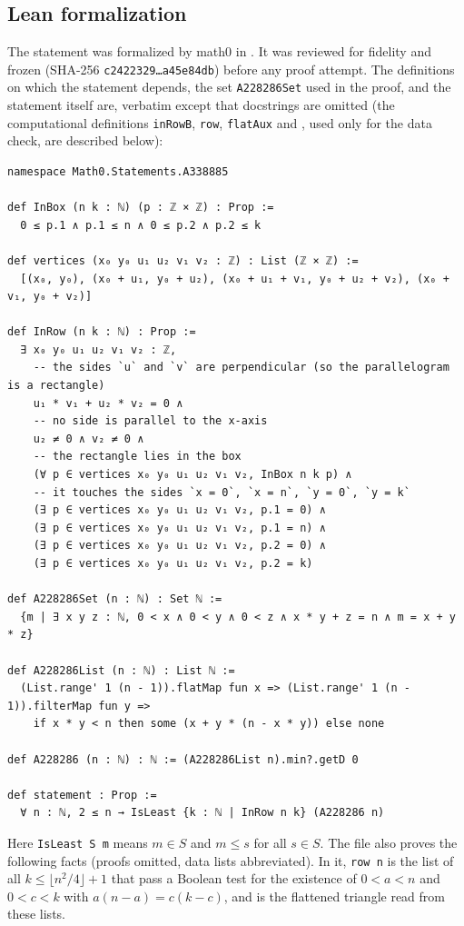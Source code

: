 \documentclass[11pt]{amsart}
\theoremstyle{plain}
\theoremstyle{definition}
\begin{document}
\subsection*{Lean formalization}
The statement was formalized by math0 in . It was reviewed for fidelity and frozen (SHA-256 \texttt{c2422329\ldots a45e84db}) before any proof attempt. The definitions on which the statement depends, the set \texttt{A228286Set} used in the proof, and the statement itself are, verbatim except that docstrings are omitted (the computational definitions \texttt{inRowB}, \texttt{row}, \texttt{flatAux} and , used only for the data check, are described below):
\begin{lstlisting}
namespace Math0.Statements.A338885

def InBox (n k : ℕ) (p : ℤ × ℤ) : Prop :=
  0 ≤ p.1 ∧ p.1 ≤ n ∧ 0 ≤ p.2 ∧ p.2 ≤ k

def vertices (x₀ y₀ u₁ u₂ v₁ v₂ : ℤ) : List (ℤ × ℤ) :=
  [(x₀, y₀), (x₀ + u₁, y₀ + u₂), (x₀ + u₁ + v₁, y₀ + u₂ + v₂), (x₀ + v₁, y₀ + v₂)]

def InRow (n k : ℕ) : Prop :=
  ∃ x₀ y₀ u₁ u₂ v₁ v₂ : ℤ,
    -- the sides `u` and `v` are perpendicular (so the parallelogram is a rectangle)
    u₁ * v₁ + u₂ * v₂ = 0 ∧
    -- no side is parallel to the x-axis
    u₂ ≠ 0 ∧ v₂ ≠ 0 ∧
    -- the rectangle lies in the box
    (∀ p ∈ vertices x₀ y₀ u₁ u₂ v₁ v₂, InBox n k p) ∧
    -- it touches the sides `x = 0`, `x = n`, `y = 0`, `y = k`
    (∃ p ∈ vertices x₀ y₀ u₁ u₂ v₁ v₂, p.1 = 0) ∧
    (∃ p ∈ vertices x₀ y₀ u₁ u₂ v₁ v₂, p.1 = n) ∧
    (∃ p ∈ vertices x₀ y₀ u₁ u₂ v₁ v₂, p.2 = 0) ∧
    (∃ p ∈ vertices x₀ y₀ u₁ u₂ v₁ v₂, p.2 = k)

def A228286Set (n : ℕ) : Set ℕ :=
  {m | ∃ x y z : ℕ, 0 < x ∧ 0 < y ∧ 0 < z ∧ x * y + z = n ∧ m = x + y * z}

def A228286List (n : ℕ) : List ℕ :=
  (List.range' 1 (n - 1)).flatMap fun x => (List.range' 1 (n - 1)).filterMap fun y =>
    if x * y < n then some (x + y * (n - x * y)) else none

def A228286 (n : ℕ) : ℕ := (A228286List n).min?.getD 0

def statement : Prop :=
  ∀ n : ℕ, 2 ≤ n → IsLeast {k : ℕ | InRow n k} (A228286 n)
\end{lstlisting}
Here \texttt{IsLeast S m} means $m\in S$ and $m\le s$ for all $s\in S$. The file also proves the following facts (proofs omitted, data lists abbreviated). In it, \texttt{row n} is the list of all $k\le\lfloor n^2/4\rfloor+1$ that pass a Boolean test for the existence of $0<a<n$ and $0<c<k$ with $a(n-a)=c(k-c)$, and  is the flattened triangle read from these lists.
\end{document}
